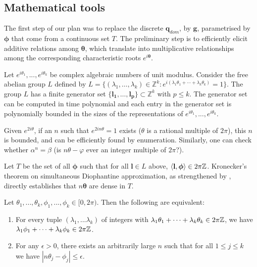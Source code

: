 \subsection{Mathematical tools}
\label{arsenal}
The first step of our plan was to replace the discrete $\mathbf{q}_{dom}$, by $\mathbf{g}$, parametrised by $\boldsymbol\phi$ that come from a continuous set $T$. The preliminary step is to efficiently elicit additive relations among $\boldsymbol\theta$, which translate into multiplicative relationships among the corresponding characteristic roots $e^{i\boldsymbol\theta}$.
 \begin{theorem}
  \label{thm:abelian}
  Let $e^{i \theta_1},...,e^{i \theta_k}$ be complex algebraic numbers of unit modulus. Consider the free abelian group $L$ defined by $L = \{(\lambda_1, \ldots ,\lambda_k) \in \mathbb{Z}^k: 
  e^{i (\lambda_1 \theta_1 + \cdots +  \lambda_k \theta_k)} = 1 \}$. 
  The group $L$ has a finite generator set $\{ \mathbf{l_1}, \ldots, \mathbf{l_p}\} \subset \mathbb{Z}^k$ with $p \le k$. The generator set can be computed in time polynomial and
  each entry in the generator set is polynomially bounded in the sizes of the representations of $e^{i \theta_1},...,e^{i \theta_k}$.
  \end{theorem}
 Given $e^{2i\theta}$, if an $n$ such that $e^{2i n \theta} = 1$ exists ($\theta$ is a rational multiple of $2\pi$), this $n$ is bounded, and can be efficiently found by enumeration. Similarly, one can check whether $\alpha^n = \beta$ (is $n\theta - \varphi$ ever an integer multiple of $2\pi$?). 
 
Let $T$ be the set of all $\boldsymbol\phi$ such that for all $\mathbf{l} \in L$ above, $\langle\mathbf{l}, \boldsymbol\phi\rangle \in 2\pi\mathbb{Z}$. Kronecker's theorem on simultaneous Diophantine approximation, as strengthened by \cite{joeljames3, ouaknine2014positivity}, directly establishes that $n\boldsymbol\theta$ are dense in $T$.
 
 \begin{theorem}
  \label{thm:kronecker}
  Let $\theta_1, ... , \theta_k, \phi_1, ... , \phi_k \in [0, 2\pi)$. Then the following are equivalent:
  \begin{enumerate}
\item For every tuple $(\lambda_1,...\lambda_k)$ of integers with 
    $\lambda_1 \theta_1 + \cdots +  \lambda_k \theta_k \in 2\pi\mathbb{Z}$, 
  we have \\$\lambda_1 \phi_1 + \cdots + \lambda_k \phi_k \in 2\pi\mathbb{Z}$.
  \item For any $\epsilon > 0$, there exists an arbitrarily large $n$ such that for all 
    $1 \le j \le k$ we have $| n \theta_j - \phi_j| \le \epsilon$.
    \end{enumerate}
  \end{theorem}
  
